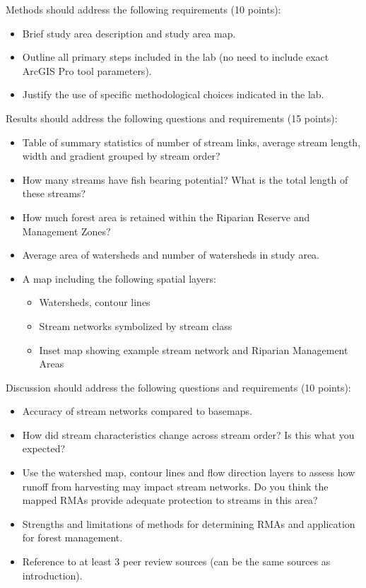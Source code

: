 \documentclass[
]{book}
\begin{document}
Methods should address the following requirements (10 points):

\begin{itemize}
\item
  Brief study area description and study area map.
\item
  Outline all primary steps included in the lab (no need to include exact ArcGIS Pro tool parameters).
\item
  Justify the use of specific methodological choices indicated in the lab.
\end{itemize}

Results should address the following questions and requirements (15 points):

\begin{itemize}
\item
  Table of summary statistics of number of stream links, average stream length, width and gradient grouped by stream order?
\item
  How many streams have fish bearing potential? What is the total length of these streams?
\item
  How much forest area is retained within the Riparian Reserve and Management Zones?
\item
  Average area of watersheds and number of watersheds in study area.
\item
  A map including the following spatial layers:

  \begin{itemize}
  \item
    Watersheds, contour lines
  \item
    Stream networks symbolized by stream class
  \item
    Inset map showing example stream network and Riparian Management Areas
  \end{itemize}
\end{itemize}

Discussion should address the following questions and requirements (10 points):

\begin{itemize}
\item
  Accuracy of stream networks compared to basemaps.
\item
  How did stream characteristics change across stream order? Is this what you expected?
\item
  Use the watershed map, contour lines and flow direction layers to assess how runoff from harvesting may impact stream networks. Do you think the mapped RMAs provide adequate protection to streams in this area?
\item
  Strengths and limitations of methods for determining RMAs and application for forest management.
\item
  Reference to at least 3 peer review sources (can be the same sources as introduction).
\end{itemize}
\end{document}
